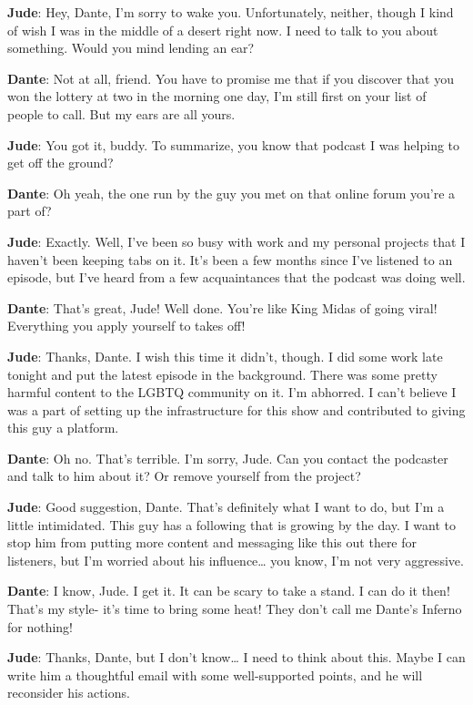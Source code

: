 \documentclass[
  letterpaper,
  DIV=11,
  numbers=noendperiod]{scrreprt}
\begin{document}
\textbf{Jude}: Hey, Dante, I'm sorry to wake you. Unfortunately,
neither, though I kind of wish I was in the middle of a desert right
now. I need to talk to you about something. Would you mind lending an
ear?

\textbf{Dante}: Not at all, friend. You have to promise me that if you
discover that you won the lottery at two in the morning one day, I'm
still first on your list of people to call. But my ears are all yours.

\textbf{Jude}: You got it, buddy. To summarize, you know that podcast I
was helping to get off the ground?

\textbf{Dante}: Oh yeah, the one run by the guy you met on that online
forum you're a part of?

\textbf{Jude}: Exactly. Well, I've been so busy with work and my
personal projects that I haven't been keeping tabs on it. It's been a
few months since I've listened to an episode, but I've heard from a few
acquaintances that the podcast was doing well.

\textbf{Dante}: That's great, Jude! Well done. You're like King Midas of
going viral! Everything you apply yourself to takes off!

\textbf{Jude}: Thanks, Dante. I wish this time it didn't, though. I did
some work late tonight and put the latest episode in the background.
There was some pretty harmful content to the LGBTQ community on it. I'm
abhorred. I can't believe I was a part of setting up the infrastructure
for this show and contributed to giving this guy a platform.

\textbf{Dante}: Oh no. That's terrible. I'm sorry, Jude. Can you contact
the podcaster and talk to him about it? Or remove yourself from the
project?

\textbf{Jude}: Good suggestion, Dante. That's definitely what I want to
do, but I'm a little intimidated. This guy has a following that is
growing by the day. I want to stop him from putting more content and
messaging like this out there for listeners, but I'm worried about his
influence\ldots{} you know, I'm not very aggressive.

\textbf{Dante}: I know, Jude. I get it. It can be scary to take a stand.
I can do it then! That's my style- it's time to bring some heat! They
don't call me Dante's Inferno for nothing!

\textbf{Jude}: Thanks, Dante, but I don't know\ldots{} I need to think
about this. Maybe I can write him a thoughtful email with some
well-supported points, and he will reconsider his actions.
\end{document}

